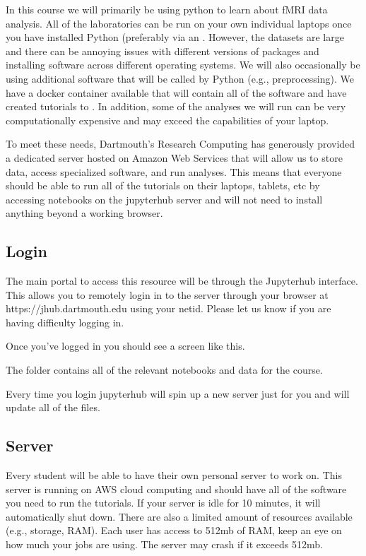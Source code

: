 \documentclass[letterpaper,10pt,english]{sphinxmanual}
\begin{document}
In this course we will primarily be using python to learn about fMRI data analysis. All of the laboratories can be run on your own individual laptops once you have installed Python (preferably via an . However, the datasets are large and there can be annoying issues with different versions of packages and installing software across different operating systems. We will also occasionally be using additional software that will be called by Python (e.g., preprocessing). We have a docker container available that will contain all of the software and have created tutorials to . In addition, some of the analyses we will run can be very computationally expensive and may exceed the capabilities of your laptop.

To meet these needs, Dartmouth’s Research Computing has generously provided a dedicated server hosted on Amazon Web Services that will allow us to store data, access specialized software, and run analyses. This means that everyone should be able to run all of the tutorials on their laptops, tablets, etc by accessing notebooks on the jupyterhub server and will not need to install anything beyond a working browser.


\subsection{Login}
\label{\detokenize{content/Introduction_to_JupyterHub:login}}
The main portal to access this resource will be through the Jupyterhub interface. This allows you to remotely login in to the server through your browser at https://jhub.dartmouth.edu using your netid. Please let us know if you are having difficulty logging in.

Once you’ve logged in you should see a screen like this.


The  folder contains all of the relevant notebooks and data for the course.

Every time you login jupyterhub will spin up a new server just for you and will update all of the files.


\subsection{Server}
\label{\detokenize{content/Introduction_to_JupyterHub:server}}
Every student will be able to have their own personal server to work on. This server is running on AWS cloud computing and should have all of the software you need to run the tutorials. If your server is idle for 10 minutes, it will automatically shut down. There are also a limited amount of resources available (e.g., storage, RAM). Each user has access to 512mb of RAM, keep an eye on how much your jobs are using. The server may crash if it exceeds 512mb.
\end{document}
